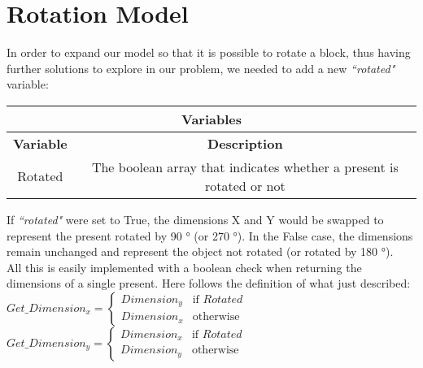 
\section{Rotation Model}
In order to expand our model so that it is possible to rotate a block, thus having further solutions to explore in our problem, we needed to add a new \textit{``rotated"} variable:
\begin{center}
		\begin{tabular}{|c|c|}
			\hline
			\multicolumn{2}{|c|}{\textbf{Variables}} \\
			\hline
			\textbf{Variable} & {\textbf{Description}} \\
			\hline
			Rotated & The boolean array that indicates whether a present is rotated or not \\
			\hline
		\end{tabular}
\end{center}
If \textit{``rotated"} were set to True, the dimensions X and Y would be swapped to represent the present rotated by 90 ° (or 270 °). In the False case, the dimensions remain unchanged and represent the object not rotated (or rotated by 180 °). \\
All this is easily implemented with a boolean check when returning the dimensions of a single present.
Here follows the definition of what just described:\\
$
Get\_Dimension_x = 
\begin{cases}
	Dimension_y & \text{if } Rotated \\
	Dimension_x & \text{otherwise}
\end{cases}
$
\\
$
Get\_Dimension_y = 
\begin{cases}
	Dimension_x & \text{if } Rotated \\
	Dimension_y & \text{otherwise}
\end{cases}
$

